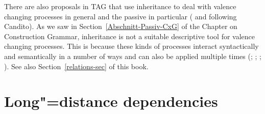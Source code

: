 There are also proposals in TAG that use inheritance to deal with valence changing processes 
in general and the passive in particular ( and  following Candito). As we saw in Section~\ref{Abschnitt-Passiv-CxG} of 
the Chapter on Construction Grammar, inheritance is not a suitable descriptive tool for valence changing processes. This is because these kinds of processes
interact syntactically and semantically in a number of ways and can also be applied multiple times
(\citealp{Mueller2006d,Mueller2007d}; \citeyear[Section~7.5.2]{MuellerLehrbuch1};
\citeyear{MuellerUnifying}; \citeyear{MWArgSt}). See also Section~\ref{relations-sec} of this book.%

\section{Long"=distance dependencies}
\label{TAG-Fernabh}

